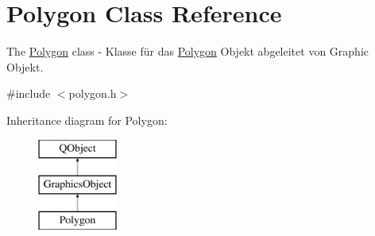 \hypertarget{class_polygon}{}\section{Polygon Class Reference}
\label{class_polygon}


The \hyperlink{class_polygon}{Polygon} class -\/ Klasse für das \hyperlink{class_polygon}{Polygon} Objekt abgeleitet von Graphic Objekt.  




{\ttfamily \#include $<$polygon.\+h$>$}

Inheritance diagram for Polygon\+:\begin{figure}[H]
\begin{center}
\leavevmode
\includegraphics[height=3.000000cm]{class_polygon}
\end{center}
\end{figure}
